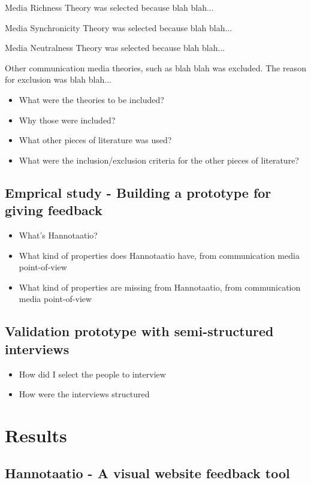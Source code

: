 \documentclass[english,12pt,a4paper,pdftex]{article}
\begin{document}
Media Richness Theory was selected because blah blah...

Media Synchronicity Theory was selected because blah blah...

Media Neutralness Theory was selected because blah blah...

Other communication media theories, such as blah blah was excluded. The reason for exclusion was blah blah...

\begin{itemize}
\item What were the theories to be included?
\item Why those were included?
\item What other pieces of literature was used?
\item What were the inclusion/exclusion criteria for the other pieces of literature?
\end{itemize}

\subsection{Emprical study - Building a prototype for giving feedback}

\begin{itemize}
\item What's Hannotaatio?
\item What kind of properties does Hannotaatio have, from communication media point-of-view
\item What kind of properties are missing from Hannotaatio, from communication media point-of-view
\end{itemize}

\subsection{Validation prototype with semi-structured interviews}

\begin{itemize}
\item How did I select the people to interview
\item How were the interviews structured
\end{itemize}


\section{Results}

\subsection{Hannotaatio - A visual website feedback tool}
\end{document}
